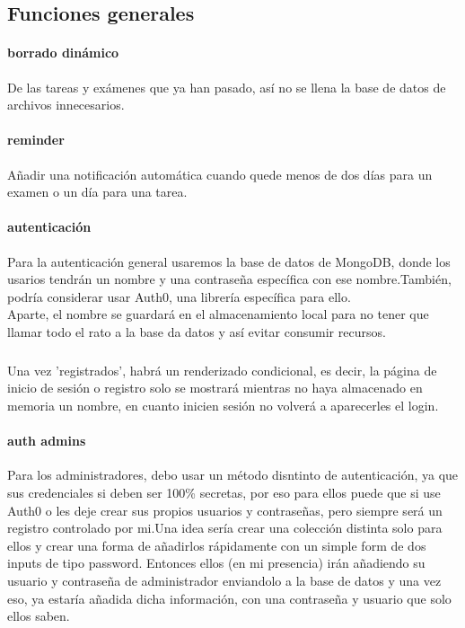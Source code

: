 \documentclass[a4paper]{article}
\begin{document}
\subsection[Generales]{Funciones generales}
\paragraph{borrado dinámico}
De las tareas y exámenes que ya han pasado, así no se llena la base de datos de 
archivos innecesarios.

\paragraph{reminder}
Añadir una notificación automática cuando quede menos de dos días para un examen o un día para
una tarea.

\paragraph{autenticación}
Para la autenticación general usaremos la base de datos de MongoDB, donde los usarios tendrán un nombre 
y una contraseña específica con ese nombre.También, podría considerar usar Auth0, una librería específica
para ello.\\ Aparte, el nombre se guardará en el almacenamiento local para no tener que llamar todo el rato
a la base da datos y así evitar consumir recursos.
\subparagraph{}
Una vez 'registrados', habrá un renderizado condicional, es decir, la página de inicio de sesión o registro 
solo se mostrará mientras no haya almacenado en memoria un nombre, en cuanto inicien sesión no volverá a 
aparecerles el login.

\paragraph{auth admins}
Para los administradores, debo usar un método disntinto de autenticación, ya que sus credenciales si 
deben ser 100\% secretas, por eso para ellos puede que si use Auth0 o les deje crear sus propios usuarios 
y contraseñas, pero siempre será un registro controlado por mi.Una idea sería crear una colección distinta
solo para ellos y crear una forma de añadirlos rápidamente con un simple form de dos inputs de tipo password. 
Entonces ellos (en mi presencia) irán añadiendo su usuario y contraseña de administrador enviandolo a la base 
de datos y una vez eso, ya estaría añadida dicha información, con una contraseña 
y usuario que solo ellos saben. 
\end{document}
